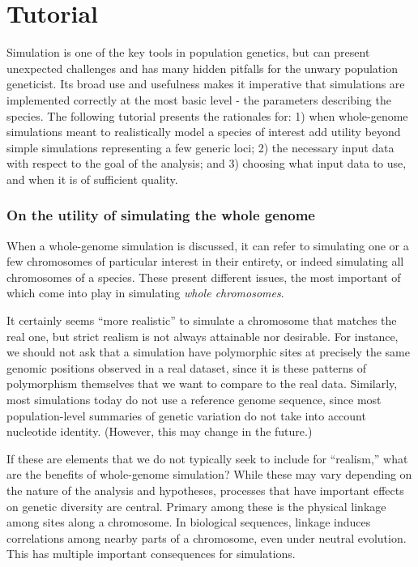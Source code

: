 \documentclass[hidelinks]{article}
\begin{document}
\hypertarget{tutorial}{%
\section*{Tutorial}\label{tutorial}}

Simulation is one of the key tools in population genetics, but can
present unexpected challenges and has many hidden pitfalls for the
unwary population geneticist. Its broad use and usefulness makes it
imperative that simulations are implemented correctly at the most basic
level - the parameters describing the species. The following tutorial
presents the rationales for: 1) when whole-genome simulations meant to
realistically model a species of interest add utility beyond simple
simulations representing a few generic loci; 2) the necessary input data
with respect to the goal of the analysis; and 3) choosing what input
data to use, and when it is of sufficient quality.

\hypertarget{on-the-utility-of-simulating-the-whole-genome}{%
\subsubsection*{On the utility of simulating the whole
genome}\label{on-the-utility-of-simulating-the-whole-genome}}

When a whole-genome simulation is discussed, it can refer to simulating
one or a few chromosomes of particular interest in their entirety, or
indeed simulating all chromosomes of a species. These present different
issues, the most important of which come into play in simulating
\emph{whole chromosomes}.

It certainly seems ``more realistic'' to simulate a chromosome that
matches the real one, but strict realism is not always attainable nor
desirable. For instance, we should not ask that a simulation have
polymorphic sites at precisely the same genomic positions observed in a
real dataset, since it is these patterns of polymorphism themselves that
we want to compare to the real data. Similarly, most simulations today
do not use a reference genome sequence, since most population-level
summaries of genetic variation do not take into account nucleotide
identity. (However, this may change in the future.)

If these are elements that we do not typically seek to include for
``realism,'' what are the benefits of whole-genome simulation? While
these may vary depending on the nature of the analysis and hypotheses,
processes that have important effects on genetic diversity are central.
Primary among these is the physical linkage among sites along a chromosome. 
In biological sequences, linkage induces correlations
among nearby parts of a chromosome, even under neutral evolution. This
has multiple important consequences for simulations.
\end{document}
